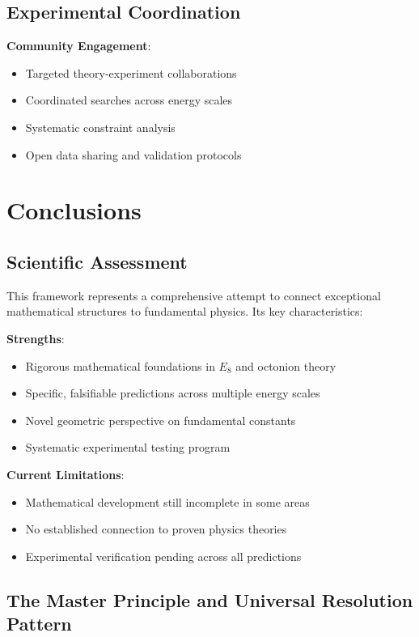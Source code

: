 \documentclass[12pt,a4paper]{article}
\begin{document}
\subsection{Experimental Coordination}

\textbf{Community Engagement}:
\begin{itemize}
\item Targeted theory-experiment collaborations
\item Coordinated searches across energy scales
\item Systematic constraint analysis
\item Open data sharing and validation protocols
\end{itemize}

\section{Conclusions}

\subsection{Scientific Assessment}

This framework represents a comprehensive attempt to connect exceptional mathematical structures to fundamental physics. Its key characteristics:

\textbf{Strengths}:
\begin{itemize}
\item Rigorous mathematical foundations in $E_{8}$ and octonion theory
\item Specific, falsifiable predictions across multiple energy scales
\item Novel geometric perspective on fundamental constants
\item Systematic experimental testing program
\end{itemize}

\textbf{Current Limitations}:
\begin{itemize}
\item Mathematical development still incomplete in some areas
\item No established connection to proven physics theories
\item Experimental verification pending across all predictions
\end{itemize}

\subsection{The Master Principle and Universal Resolution Pattern}
\end{document}
